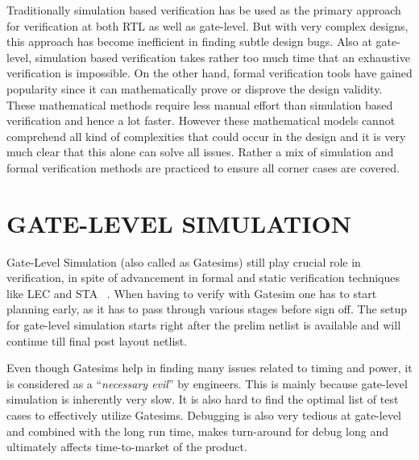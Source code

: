  Traditionally simulation based verification has be used as the primary approach for verification at both RTL as well as gate-level.  But with very complex designs, this approach has become inefficient in finding subtle design bugs. Also at gate-level, simulation based verification takes rather too much time that an exhaustive verification is impossible. On the other hand, formal verification tools have gained popularity since it can mathematically prove or disprove the design validity. These mathematical methods require less manual effort than simulation based verification and hence a lot faster. However these mathematical models cannot comprehend all kind of complexities that could occur in the design and it is very much clear that this alone can solve all issues. Rather a mix of simulation and formal verification methods are practiced to ensure all corner cases are covered. 


\section{GATE-LEVEL SIMULATION}

Gate-Level Simulation (also called as Gatesims) still play crucial role in verification, in spite of advancement in formal and static verification techniques like LEC  and STA ~\citep{ieee:segev:2004}.   When having to verify with Gatesim one has to start planning early, as it has to pass through various stages before sign off. The setup for gate-level simulation starts right after the prelim netlist is available and will continue till final post layout netlist.  

Even though Gatesims help in finding many issues related to timing and power, it is considered as a ``{\it necessary evil}'' by engineers. This is mainly because gate-level simulation is inherently very slow. It is also hard to find the optimal list of test cases to effectively utilize Gatesims. Debugging is also very tedious at gate-level and combined with the long run time, makes turn-around for debug long and ultimately affects time-to-market of the product.

